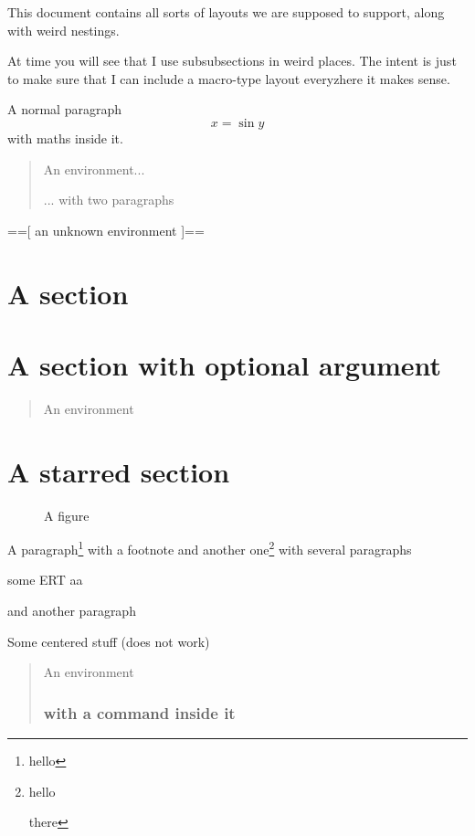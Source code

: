 \documentclass{article}
\newenvironment{foo}{==[}{]==}
\begin{document}
This document contains all sorts of layouts we are supposed to
support, along with weird nestings.

At time you will see that I use subsubsections in weird places. The
intent is just to make sure that I can include a macro-type layout
everyzhere it makes sense.

A normal paragraph
\begin{equation}
x = \sin y
\end{equation}
with maths inside it.

\begin{quote}
An environment...

... with two paragraphs
\end{quote}

\begin{foo}
an unknown environment
\end{foo}


\section{A section}

\section[Hello!]{A section with optional argument}

\begin{quote}
An environment
\end{quote}

\section*{A starred section}

\begin{figure}
\caption{A figure}
\end{figure}

A paragraph\footnote{hello} with a footnote and another
one\footnote{hello

there} with several paragraphs

some ERT \vspace{1cm} aa

and another paragraph

\begin{center}
Some centered stuff (does not work)
\end{center}

\begin{quotation}
An environment

\subsubsection*{with a command inside it}
\end{quotation}
\end{document}
